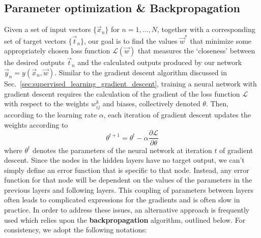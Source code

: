 \documentclass[../main.tex]{subfiles}
\begin{document}
\subsection{Parameter optimization \& Backpropagation}
Given a set of input vectors $\{\vec{x}_{n}\}$ for $n = 1, \ldots, N$, together
with a corresponding set of target vectors $\{\vec{t}_{n}\}$, our goal is to
find the values $\vec{w}^{*}$ that minimize some appropriately chosen loss
function $\mathcal{L}(\vec{w})$ that measures the `closeness' between the
desired outputs $\vec{t}_{n}$ and the calculated outputs produced by our
network $\vec{y}_n = y(\vec{x}_{n}, \vec{w})$.
%
%
Similar to the gradient descent algorithm discussed in
Sec.~\ref{sec:supervised_learning_gradient_descent}, training a neural network
with gradient descent requires the calculation of the gradient of the loss
function $\mathcal{L}$ with respect to the weights $w_{ij}^{k}$ and biases,
collectively denoted $\theta$.
%
Then, according to the learning rate $\alpha$, each iteration of gradient
descent updates the weights according to
%
\begin{equation}
  \theta^{t+1} = \theta^{t} - \alpha \frac{\partial \mathcal{L}}{\partial \theta}
\end{equation}
%
where $\theta^{t}$ denotes the parameters of the neural network at iteration
$t$ of gradient descent.
%
Since the nodes in the hidden layers have no target output, we can't simply
define an error function that is specific to that node. 
%
Instead, any error function for that node will be dependent on the values of
the parameters in the previous layers and following layers.
%
This coupling of parameters between layers often leads to complicated
expressions for the gradients and is often slow in practice.
%
In order to address these issues, an alternative approach is frequently used
which relies upon the \textbf{backpropagation} algorithm, outlined below.
%
For consistency, we adopt the following notations:
%
\end{document}
